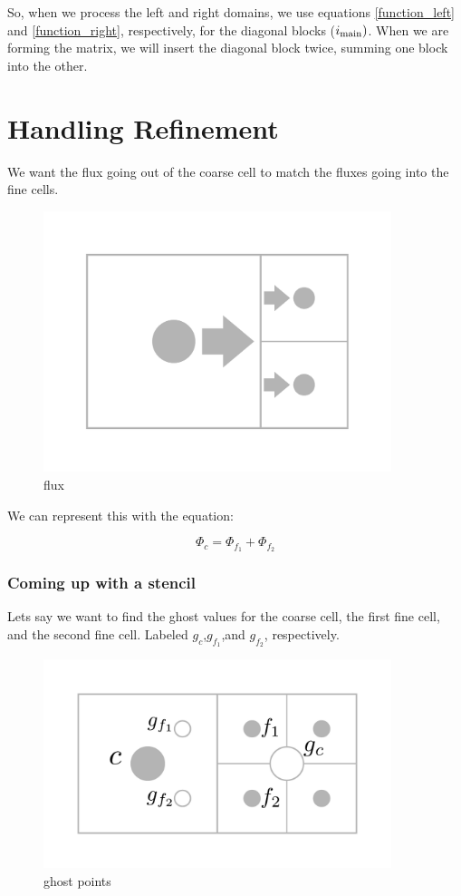 \documentclass[12pt]{article}
\begin{document}
So, when we process the left and right domains, we use equations \ref{function_left} and 
\ref{function_right}, respectively, for the diagonal blocks ($i_{\textnormal{main}})$.
When we are forming the matrix, we will insert the diagonal
block twice, summing one block into the other.




\section{Handling Refinement}
We want the flux going out of the coarse cell to match the fluxes going into 
the fine cells.

\begin{figure}[H]
    \centering
    \includegraphics[width=4in]{images/amrflux.pdf}
    \caption{flux}
\end{figure}

We can represent this with the equation:

\begin{equation}
    \Phi_{c}=\Phi_{f_1}+\Phi_{f_2}
    \label{fluxconsv}
\end{equation}

\subsubsection*{Coming up with a stencil}
Lets say we want to find the ghost values for the coarse cell, the first fine cell, and the second
fine cell. Labeled $g_c$,$g_{f_1}$,and $g_{f_2}$, respectively.

\begin{figure}[H]
    \centering
    \includegraphics[width=4in]{images/ghost.pdf}
    \caption{ghost points}
\end{figure}
\end{document}
